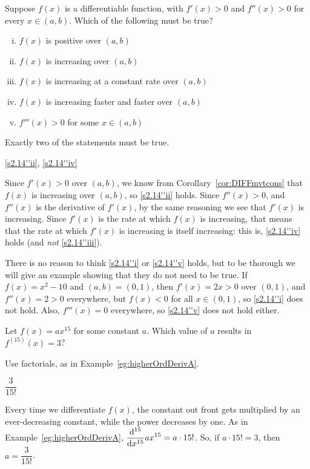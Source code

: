 \begin{Mquestion}
Suppose $f(x)$ is a differentiable function, with $f'(x)>0$ and $f''(x)>0$ for every $x \in (a,b)$. Which of the following must be true?
\begin{enumerate}[(i)]
\item\label{s2.14''i} $f(x)$ is positive over $(a,b)$
\item\label{s2.14''ii} $f(x)$ is increasing over $(a,b)$
\item\label{s2.14''iii} $f(x)$ is increasing at a constant rate over $(a,b)$
\item\label{s2.14''iv} $f(x)$ is increasing faster and faster over $(a,b)$
\item\label{s2.14''v} $f'''(x)>0$ for some $x \in (a,b)$
\end{enumerate}
\end{Mquestion}
\begin{hint} Exactly two of the statements must be true.
\end{hint}
\begin{answer}
\eqref{s2.14''ii}, \eqref{s2.14''iv}
\end{answer}
\begin{solution}
Since $f'(x)>0$ over $(a,b)$, we know from Corollary~\ref*{cor:DIFFmvtcons}
that $f(x)$ is increasing over $(a,b)$, so \eqref{s2.14''ii} holds. Since $f''(x)>0$, and $f''(x)$ is the derivative of $f'(x)$, by the same reasoning we see that $f'(x)$ is increasing. Since $f'(x)$ is the rate at which $f(x)$ is increasing, that means that the rate at which $f'(x)$ is increasing is itself increasing: this is, \eqref{s2.14''iv} holds (and \emph{not} \eqref{s2.14''iii}).

There is no reason to think \eqref{s2.14''i} or \eqref{s2.14''v} holds, but to be thorough we will give an example showing that they do not need to be true. If $f(x)=x^2-10$ and $(a,b)=(0,1)$, then $f'(x)=2x>0$ over $(0,1)$, and $f''(x)=2>0$ everywhere, but $f(x)<0$ for all $x \in (0,1)$, so \eqref{s2.14''i} does not hold. Also, $f'''(x)=0$ everywhere, so \eqref{s2.14''v} does not hold either.
\end{solution}







\begin{question}
Let $f(x)=ax^{15}$ for some constant $a$. Which value of $a$ results in $f^{(15)}(x)=3$?
\end{question}
\begin{hint}
Use factorials, as in Example~\ref*{eg:higherOrdDerivA}.
\end{hint}
\begin{answer}
$\dfrac{3}{15!}$
\end{answer}
\begin{solution}
Every time we differentiate $f(x)$, the constant out front gets multiplied by an ever-decreasing constant, while the power decreases by one. As in Example~\ref*{eg:higherOrdDerivA}, $\displaystyle\frac{\mathrm{d}^{15}}{\mathrm{d}{x}^{15}}ax^{15}=a\cdot 15!$. So, if $a\cdot 15!=3$, then $a=\dfrac{3}{15!}$.
\end{solution}




